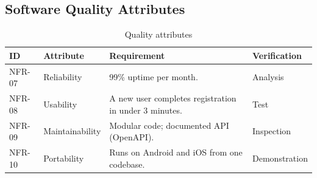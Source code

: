 \subsection{Software Quality Attributes}
\begin{table}[H]
\centering
\caption{Quality attributes}\label{tab:quality}
\begin{tabularx}{\textwidth}{|L{1.6cm}|L{2.8cm}|X|L{2.2cm}|}
\hline
{}\sffamily\bfseries ID & \sffamily\bfseries Attribute & \sffamily\bfseries Requirement & \sffamily\bfseries Verification \\ \hline
NFR-07 & Reliability     & 99\% uptime per month. & Analysis \\ \hline
NFR-08 & Usability       & A new user completes registration in under 3 minutes. & Test \\ \hline
NFR-09 & Maintainability & Modular code; documented API (OpenAPI). & Inspection \\ \hline
NFR-10 & Portability     & Runs on Android and iOS from one codebase. & Demonstration \\ \hline
\end{tabularx}
\end{table}
